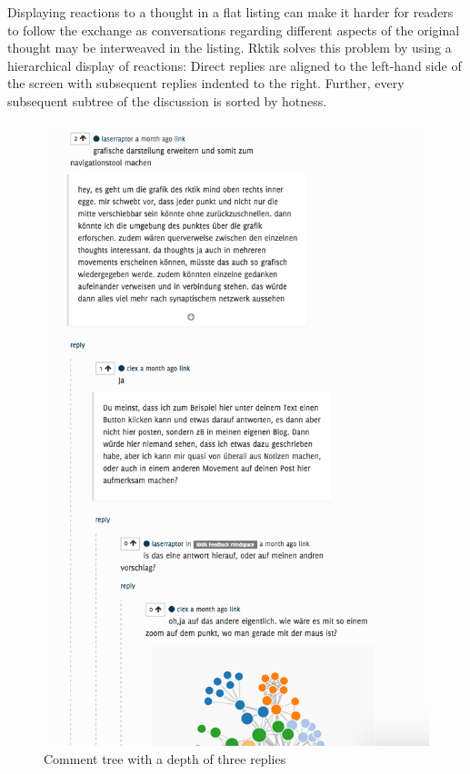 Displaying reactions to a thought in a flat listing can make it harder
for readers to follow the exchange as conversations regarding different
aspects of the original thought may be interweaved in the listing. Rktik
solves this problem by using a hierarchical display of reactions: Direct
replies are aligned to the left-hand side of the screen with subsequent
replies indented to the right. Further, every subsequent subtree of the
discussion is sorted by hotness.

\begin{figure}[htbp]
\centering
\includegraphics{img/comment_tree.png}
\caption{Comment tree with a depth of three replies}
\end{figure}

